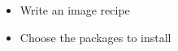 {
  \begin{itemize}
    \item Write an image recipe
    \item Choose the packages to install
  \end{itemize}
}

